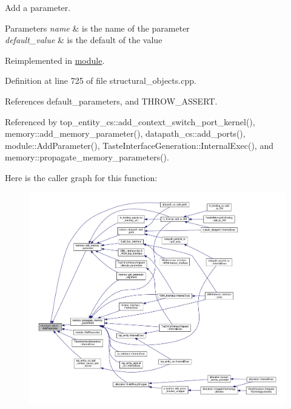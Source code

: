 Add a parameter. 


\begin{DoxyParams}{Parameters}
{\em name} & is the name of the parameter \\
\hline
{\em default\+\_\+value} & is the default of the value \\
\hline
\end{DoxyParams}


Reimplemented in \hyperlink{classmodule_a08f3658653bf691cfe80c3f6db6a2e60}{module}.



Definition at line 725 of file structural\+\_\+objects.\+cpp.



References default\+\_\+parameters, and T\+H\+R\+O\+W\+\_\+\+A\+S\+S\+E\+RT.



Referenced by top\+\_\+entity\+\_\+cs\+::add\+\_\+context\+\_\+switch\+\_\+port\+\_\+kernel(), memory\+::add\+\_\+memory\+\_\+parameter(), datapath\+\_\+cs\+::add\+\_\+ports(), module\+::\+Add\+Parameter(), Taste\+Interface\+Generation\+::\+Internal\+Exec(), and memory\+::propagate\+\_\+memory\+\_\+parameters().

Here is the caller graph for this function\+:
\nopagebreak
\begin{figure}[H]
\begin{center}
\leavevmode
\includegraphics[width=350pt]{d8/da3/classstructural__object_a83ccf7f94a7c5d4590f337ff2b97c5b3_icgraph}
\end{center}
\end{figure}
\mbox{\label{classstructural__object_a9cae0eae58b6f33a704cef27ed551692}} 
